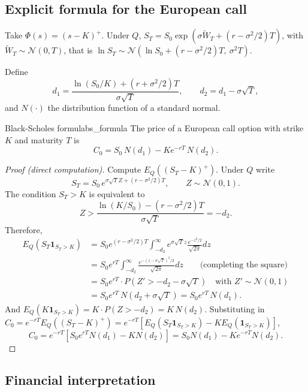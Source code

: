 \documentclass[11pt, a4paper]{article}
\begin{document}
\subsection{Explicit formula for the European call}

Take $\Phi(s) = (s - K)^+$. Under $Q$, $S_T = S_0 \exp(\sigma \widetilde{W}_T + (r -
\sigma^2/2) T)$, with $\widetilde{W}_T \sim \mathcal{N}(0, T)$, that is
$\ln S_T \sim \mathcal{N}(\ln S_0 + (r - \sigma^2/2) T, \ \sigma^2 T)$.

Define
$$ d_1 = \frac{\ln(S_0/K) + (r + \sigma^2/2) T}{\sigma \sqrt{T}}, \qquad
d_2 = d_1 - \sigma \sqrt{T}, $$
and $N(\cdot)$ the distribution function of a standard normal.

\begin{teorema}{Black-Scholes formula}{bs_formula}
The price of a European call option with strike $K$ and maturity $T$ is
$$ C_0 = S_0 \, N(d_1) - K e^{-rT} \, N(d_2). $$
\end{teorema}

\begin{proof}[Proof (direct computation)]
Compute $E_Q((S_T - K)^+)$. Under $Q$ write
$$ S_T = S_0 \, e^{\sigma \sqrt{T} Z + (r - \sigma^2/2) T}, \qquad Z \sim \mathcal{N}(0, 1). $$
The condition $S_T > K$ is equivalent to
$$ Z > \frac{\ln(K/S_0) - (r - \sigma^2/2) T}{\sigma \sqrt{T}} = -d_2. $$
Therefore,
\begin{align*}
E_Q(S_T \mathbf{1}_{S_T > K}) &= S_0 e^{(r - \sigma^2/2) T} \int_{-d_2}^\infty e^{\sigma \sqrt{T} z}
\frac{e^{-z^2/2}}{\sqrt{2\pi}} dz \\
&= S_0 e^{rT} \int_{-d_2}^\infty \frac{e^{-(z - \sigma\sqrt{T})^2/2}}{\sqrt{2\pi}} dz
\qquad \text{(completing the square)} \\
&= S_0 e^{rT} \cdot P(Z' > -d_2 - \sigma\sqrt{T}) \quad \text{with } Z' \sim \mathcal{N}(0,1) \\
&= S_0 e^{rT} \, N(d_2 + \sigma\sqrt{T}) = S_0 e^{rT} \, N(d_1).
\end{align*}
And $E_Q(K \mathbf{1}_{S_T > K}) = K \cdot P(Z > -d_2) = K \, N(d_2)$. Substituting in
$C_0 = e^{-rT} E_Q((S_T - K)^+) = e^{-rT}[E_Q(S_T \mathbf{1}_{S_T > K}) - K E_Q(\mathbf{1}_{S_T >
K})]$,
$$ C_0 = e^{-rT}[S_0 e^{rT} N(d_1) - K N(d_2)] = S_0 N(d_1) - K e^{-rT} N(d_2). $$
\end{proof}

\subsection{Financial interpretation}
\end{document}
